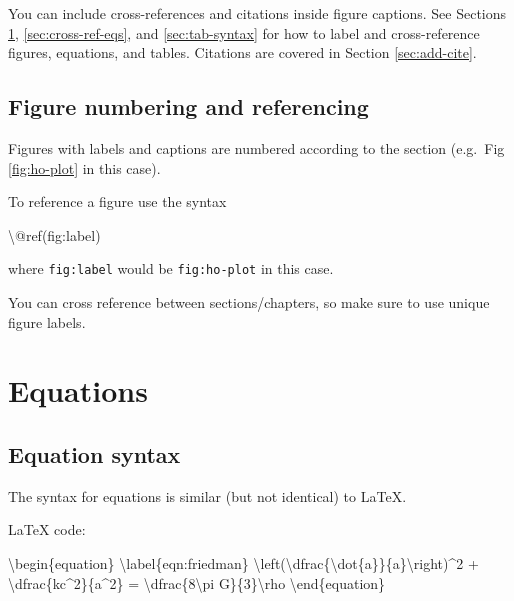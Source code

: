 \documentclass[]{book}
\newenvironment{Shaded}{\begin{snugshade}}{\end{snugshade}}
\newcommand{\BaseNTok}[1]{\textcolor[rgb]{0.00,0.00,0.81}{#1}}
\newcommand{\NormalTok}[1]{#1}
\begin{document}
You can include cross-references and citations inside figure captions. See Sections \ref{sec:fig-nos}, \ref{sec:cross-ref-eqs}, and \ref{sec:tab-syntax} for how to label and cross-reference figures, equations, and tables. Citations are covered in Section \ref{sec:add-cite}.

\hypertarget{sec:fig-nos}{%
\section{Figure numbering and referencing}\label{sec:fig-nos}}

Figures with labels and captions are numbered according to the section (e.g.~Fig \ref{fig:ho-plot} in this case).

To reference a figure use the syntax

\begin{Shaded}
\begin{Highlighting}[]
\NormalTok{\textbackslash{}@ref(fig:label)}
\end{Highlighting}
\end{Shaded}

where \texttt{fig:label} would be \texttt{fig:ho-plot} in this case.

You can cross reference between sections/chapters, so make sure to use unique figure labels.

\hypertarget{sec:equations}{%
\chapter{Equations}\label{sec:equations}}

\hypertarget{sec:add-eqs}{%
\section{Equation syntax}\label{sec:add-eqs}}

The syntax for equations is similar (but not identical) to LaTeX.

LaTeX code:

\begin{Shaded}
\begin{Highlighting}[]
\NormalTok{\textbackslash{}begin\{equation\}}
\NormalTok{\textbackslash{}label\{eqn:friedman\}}
\BaseNTok{    \textbackslash{}left(\textbackslash{}dfrac\{\textbackslash{}dot\{a\}\}\{a\}\textbackslash{}right)^2 + \textbackslash{}dfrac\{kc^2\}\{a^2\} = \textbackslash{}dfrac\{8\textbackslash{}pi G\}\{3\}\textbackslash{}rho }
\NormalTok{\textbackslash{}end\{equation\}}
\end{Highlighting}
\end{Shaded}
\end{document}
